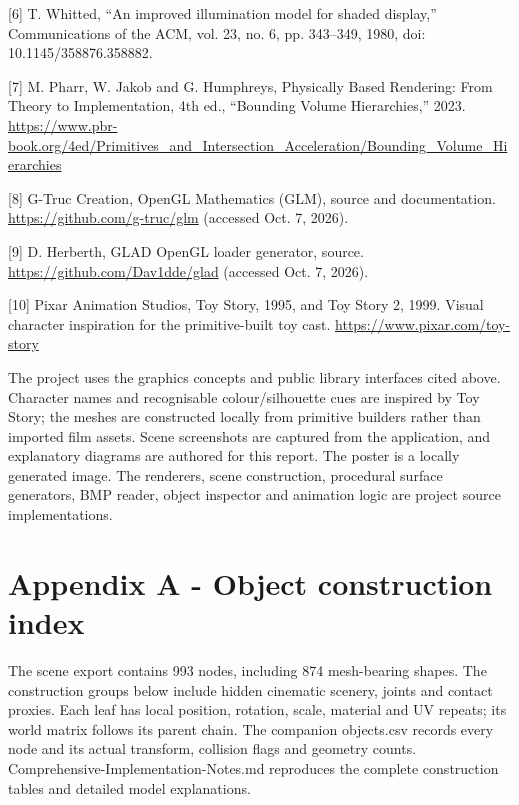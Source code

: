 \documentclass[12pt,a4paper]{article}
\begin{document}
[6] T. Whitted, ``An improved illumination model for shaded display,'' Communications of the ACM, vol. 23, no. 6, pp. 343--349, 1980, doi: 10.1145/358876.358882.

[7] M. Pharr, W. Jakob and G. Humphreys, Physically Based Rendering: From Theory to Implementation, 4th ed., ``Bounding Volume Hierarchies,'' 2023. \url{https://www.pbr-book.org/4ed/Primitives_and_Intersection_Acceleration/Bounding_Volume_Hierarchies}

[8] G-Truc Creation, OpenGL Mathematics (GLM), source and documentation. \url{https://github.com/g-truc/glm} (accessed Oct. 7, 2026).

[9] D. Herberth, GLAD OpenGL loader generator, source. \url{https://github.com/Dav1dde/glad} (accessed Oct. 7, 2026).

[10] Pixar Animation Studios, Toy Story, 1995, and Toy Story 2, 1999. Visual character inspiration for the primitive-built toy cast. \url{https://www.pixar.com/toy-story}

The project uses the graphics concepts and public library interfaces cited above. Character names and recognisable colour/silhouette cues are inspired by Toy Story; the meshes are constructed locally from primitive builders rather than imported film assets. Scene screenshots are captured from the application, and explanatory diagrams are authored for this report. The poster is a locally generated image. The renderers, scene construction, procedural surface generators, BMP reader, object inspector and animation logic are project source implementations.

\section*{Appendix A - Object construction index}
The scene export contains 993 nodes, including 874 mesh-bearing shapes. The construction groups below include hidden cinematic scenery, joints and contact proxies. Each leaf has local position, rotation, scale, material and UV repeats; its world matrix follows its parent chain. The companion objects.csv records every node and its actual transform, collision flags and geometry counts. Comprehensive-Implementation-Notes.md reproduces the complete construction tables and detailed model explanations.
\end{document}
